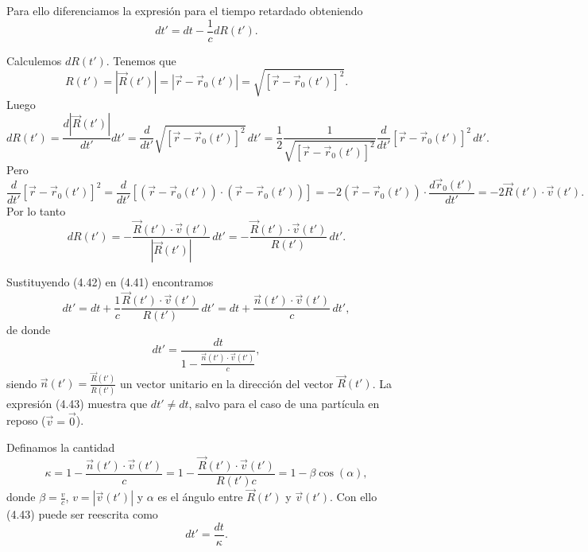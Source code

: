 \documentclass[12pt,a4paper]{book}
\begin{document}
Para ello diferenciamos la expresión para el tiempo retardado obteniendo
\begin{equation}
dt' = dt - \frac{1}{c}dR(t').
\end{equation}

Calculemos $dR(t')$. Tenemos que
\begin{equation}
R(t') = |\vec{R}(t')| = |\vec{r} - \vec{r}_0(t')| = \sqrt{[\vec{r} - \vec{r}_0(t')]^2}.
\end{equation}
Luego
\begin{equation}
dR(t') = \frac{d|\vec{R}(t')|}{dt'}dt' = \frac{d}{dt'}\sqrt{[\vec{r} - \vec{r}_0(t')]^2}\,dt' = \frac{1}{2}\frac{1}{\sqrt{[\vec{r} - \vec{r}_0(t')]^2}}\frac{d}{dt'}[\vec{r} - \vec{r}_0(t')]^2\,dt'.
\end{equation}
Pero
\begin{equation}
\frac{d}{dt'}[\vec{r} - \vec{r}_0(t')]^2 = \frac{d}{dt'}[(\vec{r} - \vec{r}_0(t')) \cdot (\vec{r} - \vec{r}_0(t'))] = -2(\vec{r} - \vec{r}_0(t')) \cdot \frac{d\vec{r}_0(t')}{dt'} = -2\vec{R}(t') \cdot \vec{v}(t').
\end{equation}
Por lo tanto
\begin{equation}
dR(t') = -\frac{\vec{R}(t') \cdot \vec{v}(t')}{|\vec{R}(t')|}\,dt' = -\frac{\vec{R}(t') \cdot \vec{v}(t')}{R(t')}\,dt'.
\end{equation}

Sustituyendo (4.42) en (4.41) encontramos
\begin{equation}
dt' = dt + \frac{1}{c}\frac{\vec{R}(t') \cdot \vec{v}(t')}{R(t')}\,dt' = dt + \frac{\vec{n}(t') \cdot \vec{v}(t')}{c}\,dt',
\end{equation}
de donde
\begin{equation}
dt' = \frac{dt}{1 - \frac{\vec{n}(t') \cdot \vec{v}(t')}{c}},
\end{equation}
siendo $\vec{n}(t') = \frac{\vec{R}(t')}{R(t')}$ un vector unitario en la dirección del vector $\vec{R}(t')$. La expresión (4.43) muestra que $dt' \neq dt$, salvo para el caso de una partícula en reposo ($\vec{v} = \vec{0}$).

Definamos la cantidad
\begin{equation}
\kappa = 1 - \frac{\vec{n}(t') \cdot \vec{v}(t')}{c} = 1 - \frac{\vec{R}(t') \cdot \vec{v}(t')}{R(t')c} = 1 - \beta\cos(\alpha),
\end{equation}
donde $\beta = \frac{v}{c}$, $v = |\vec{v}(t')|$ y $\alpha$ es el ángulo entre $\vec{R}(t')$ y $\vec{v}(t')$. Con ello (4.43) puede ser reescrita como
\begin{equation}
dt' = \frac{dt}{\kappa}.
\end{equation}
\end{document}
